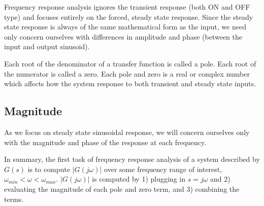 Frequency response analysis ignores the transient response (both ON and OFF type) and focuses entirely on the forced, steady state response.  Since the steady state response is always of the same mathematical form as the input, we need only concern ourselves with differences in amplitude and phase (between the input and output sinusoid).



Each root of the denominator of a transfer function is called a pole.  Each root of the numerator is called a zero.  Each pole and zero is a real or complex number which affects how the system response to both transient and steady state inputs.

\subsection{Magnitude}
As we focus on steady state sinusoidal response, we will concern ourselves only with the magnitude and phase of the response at each frequency.

In summary, the first task of frequency response analysis of a system described by $G(s)$ is to compute $|G(j\omega)|$ over some frequency range of interest, $\omega_{min} < \omega < \omega_{max}$.
$|G(j\omega)|$ is computed by 1) plugging in $s=j\omega$ and 2) evaluating the magnitude of each pole and zero term, and 3) combining the terms.


